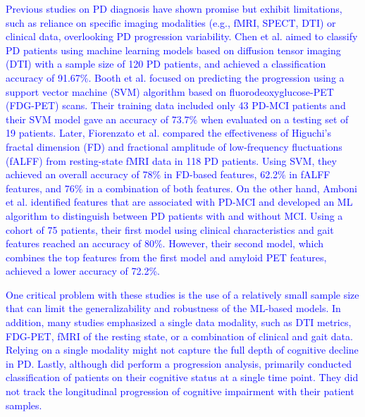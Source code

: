 \documentclass[twocolumn]{article}
\begin{document}
\textcolor{blue}{Previous studies on PD diagnosis have shown promise but exhibit limitations, such as reliance on specific imaging modalities (e.g., fMRI, SPECT, DTI) or clinical data, overlooking PD progression variability. Chen et al. \cite{chen2023detection} aimed to classify PD patients using machine learning models based on diffusion tensor imaging (DTI) with a sample size of 120 PD patients, and achieved a classification accuracy of 91.67\%. Booth et al. \cite{booth2022predicting} focused on predicting the progression using a support vector machine (SVM) algorithm based on fluorodeoxyglucose-PET (FDG-PET) scans. Their training data included only 43 PD-MCI patients and their SVM model gave an accuracy of 73.7\% when evaluated on a testing set of 19 patients. Later, Fiorenzato et al. \cite{fiorenzato2024brain} compared the effectiveness of Higuchi's fractal dimension (FD) and fractional amplitude of low-frequency fluctuations (fALFF) from resting-state fMRI data in 118 PD patients. Using SVM, they achieved an overall accuracy of 78\% in FD-based features, 62.2\% in fALFF features, and 76\% in a combination of both features. On the other hand, Amboni et al. \cite{amboni2022machine} identified features that are associated with PD-MCI and developed an ML algorithm to distinguish between PD patients with and without MCI. Using a cohort of 75 patients, their first model using clinical characteristics and gait features reached an accuracy of 80\%. However, their second model, which combines the top features from the first model and amyloid PET features, achieved a lower accuracy of 72.2\%.}

\textcolor{blue}{One critical problem with these studies \cite{chen2023detection, booth2022predicting, fiorenzato2024brain, amboni2022machine} is the use of a relatively small sample size that can limit the generalizability and robustness of the ML-based models. In addition, many studies emphasized a single data modality, such as DTI metrics, FDG-PET, fMRI of the resting state, or a combination of clinical and gait data. Relying on a single modality might not capture the full depth of cognitive decline in PD. Lastly, although \cite{booth2022predicting} did perform a progression analysis, \cite{chen2023detection, fiorenzato2024brain, amboni2022machine} primarily conducted classification of patients on their cognitive status at a single time point. They did not track the longitudinal progression of cognitive impairment with their patient samples.}
\end{document}

